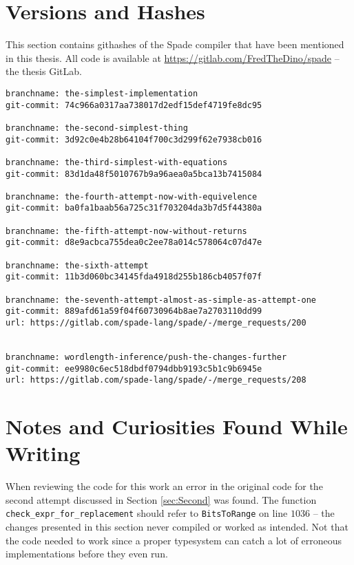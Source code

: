 \chapter{Versions and Hashes}
\label{app:VersionsAndGitHashes}
This section contains githashes of the Spade compiler that have been mentioned in this thesis.
All code is available at \href{https://gitlab.com/FredTheDino/spade}{https://gitlab.com/FredTheDino/spade} -- the thesis GitLab.
\begin{verbatim}
branchname: the-simplest-implementation
git-commit: 74c966a0317aa738017d2edf15def4719fe8dc95

branchname: the-second-simplest-thing
git-commit: 3d92c0e4b28b64104f700c3d299f62e7938cb016

branchname: the-third-simplest-with-equations
git-commit: 83d1da48f5010767b9a96aea0a5bca13b7415084

branchname: the-fourth-attempt-now-with-equivelence
git-commit: ba0fa1baab56a725c31f703204da3b7d5f44380a

branchname: the-fifth-attempt-now-without-returns
git-commit: d8e9acbca755dea0c2ee78a014c578064c07d47e

branchname: the-sixth-attempt
git-commit: 11b3d060bc34145fda4918d255b186cb4057f07f

branchname: the-seventh-attempt-almost-as-simple-as-attempt-one
git-commit: 889afd61a59f04f60730964b8ae7a2703110dd99
url: https://gitlab.com/spade-lang/spade/-/merge_requests/200


branchname: wordlength-inference/push-the-changes-further
git-commit: ee9980c6ec518dbdf0794dbb9193c5b1c9b6945e
url: https://gitlab.com/spade-lang/spade/-/merge_requests/208
\end{verbatim}

\chapter{Notes and Curiosities Found While Writing}
When reviewing the code for this work an error in the original code for the second attempt discussed in Section \ref{sec:Second} was found. The function \verb+check_expr_for_replacement+ should refer to \verb+BitsToRange+ on line $1036$ -- the changes presented in this section never compiled or worked as intended. Not that the code needed to work since a proper typesystem can catch a lot of erroneous implementations before they even run.

